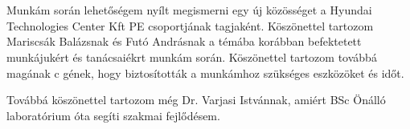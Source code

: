 \chapter*{\koszonetnyilvanitas}

Munkám során lehetőségem nyílt megismerni egy új közösséget a Hyundai Technologies Center Kft PE csoportjának tagjaként. Köszönettel tartozom Mariscsák Balázsnak és Futó Andrásnak a témába korábban befektetett munkájukért és tanácsaiékrt munkám során. Köszönettel tartozom továbbá magának c gének, hogy biztosították a munkámhoz szükséges eszközöket és időt.

Továbbá köszönettel tartozom még Dr. Varjasi Istvánnak, amiért BSc Önálló laboratórium óta segíti szakmai fejlődésem.